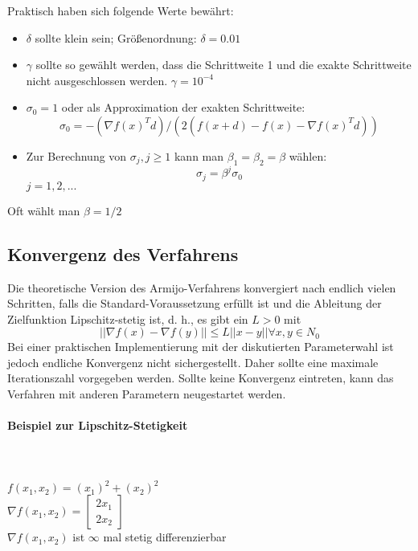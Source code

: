 Praktisch haben sich folgende Werte bewährt:
\begin{itemize}
\item $\delta$ sollte klein sein; Größenordnung: $\delta = 0.01$
\item$\gamma$ sollte so gewählt werden, dass die Schrittweite 1 und die exakte
Schrittweite nicht ausgeschlossen werden. $\gamma = 10^{-4}$
\item $\sigma_0 = 1$ oder als Approximation der exakten Schrittweite:
\begin{equation}
\sigma_0 = - (\nabla f(x)^T d) / (2 (f(x + d) - f(x) - \nabla f(x)^T d))
\end{equation}
\item Zur Berechnung von $\sigma_j,j \geq 1$ kann man $\beta_1 = \beta_2 = \beta$ wählen:
\begin{equation}
\sigma_j = \beta^j \sigma_0 
\end{equation}
$j = 1, 2, . . .$

\end{itemize}
Oft wählt man $\beta = 1/2$

\subsection{Konvergenz des Verfahrens}

Die theoretische Version des Armijo-Verfahrens konvergiert nach endlich
vielen Schritten, falls die Standard-Voraussetzung erfüllt ist und die
Ableitung der Zielfunktion Lipschitz-stetig ist, d. h., es gibt ein $L > 0$ mit
\begin{equation}
|| \nabla f(x) - \nabla f(y)|| \leq L ||x - y|| \forall x,y \in N_0
\end{equation}
Bei einer praktischen Implementierung mit der diskutierten
Parameterwahl ist jedoch endliche Konvergenz nicht sichergestellt.
Daher sollte eine maximale Iterationszahl vorgegeben werden. Sollte
keine Konvergenz eintreten, kann das Verfahren mit anderen Parametern
neugestartet werden.

\paragraph{Beispiel zur Lipschitz-Stetigkeit}\mbox{}\\
\\
$f(x_1,x_2) = (x_1)^2 + (x_2)^2 $\\
$\nabla f(x_1,x_2) = \begin{bmatrix}2x_1\\2x_2\end{bmatrix}$\\
$\nabla f(x_1,x_2)$ ist $\infty$ mal stetig differenzierbar\\

